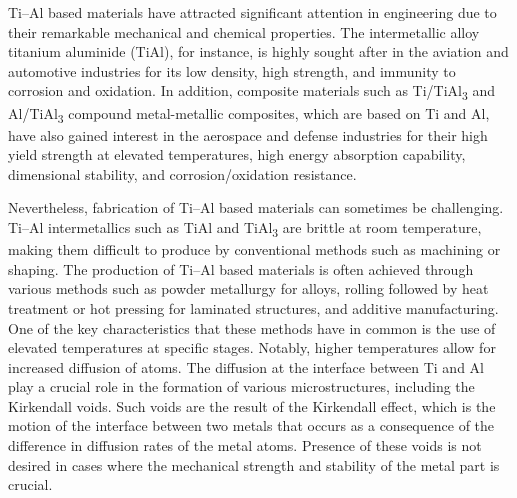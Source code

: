 Ti--Al based materials have attracted significant attention in engineering due to their remarkable mechanical and chemical properties. The intermetallic alloy titanium aluminide (TiAl), for instance, is highly sought after in the aviation and automotive industries for its low density, high strength, and immunity to corrosion and oxidation.\cite{emiraliouglu2022additive} In addition, composite materials such as Ti/TiAl\textsubscript{3} and Al/TiAl\textsubscript{3} compound metal-metallic composites, which are based on Ti and Al, have also gained interest in the aerospace and defense industries for their high yield strength at elevated temperatures, high energy absorption capability, dimensional stability, and corrosion/oxidation resistance.\cite{zhang2022formation,ma2020microstructure} 

Nevertheless, fabrication of Ti--Al based materials can sometimes be challenging. Ti--Al intermetallics such as TiAl and TiAl\textsubscript{3} are brittle at room temperature, making them difficult to produce by conventional methods such as machining or shaping.\cite{emiraliouglu2022additive,dilip2017novel} The production of Ti--Al based materials is often achieved through various methods such as powder metallurgy for alloys,\cite{emiraliouglu2022additive} rolling followed by heat treatment or hot pressing for laminated structures,\cite{zhang2022formation,ma2020microstructure} and additive manufacturing.\cite{emiraliouglu2022additive} One of the key characteristics that these methods have in common is the use of elevated temperatures at specific stages. Notably, higher temperatures allow for increased diffusion of atoms.\cite{thiyaneshwaran2018nucleation} The diffusion at the interface between Ti and Al play a crucial role in the formation of various microstructures, including the Kirkendall voids.\cite{thiyaneshwaran2018nucleation} Such voids are the result of the Kirkendall effect, which is the motion of the interface between two metals that occurs as a consequence of the difference in diffusion rates of the metal atoms.\cite{wang2013hollow,el2015kirkendall} Presence of these voids is not desired in cases where the mechanical strength and stability of the metal part is crucial.\cite{sun2020fracture}

